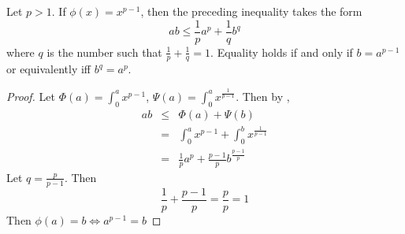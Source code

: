 \begin{pblm}\label{p:130}%
	Let $p > 1$. If $\phi(x) = x^{p-1}$, then the preceding inequality takes the form 
	\begin{equation*}
		ab \le \frac{1}{p}a^p + \frac{1}{q}b^q
	\end{equation*}
	where $q$ is the number such that $\frac{1}{p} + \frac{1}{q} = 1$. Equality holds if 
	and only if $b = a^{p-1}$ or equivalently iff $b^q = a^p$. 
\begin{proof}
	Let $\Phi(a) = \int_0^ax^{p-1}$, $\Psi(a) = \int_0^ax^{\frac{1}{p-1}}$. Then by ,
	\begin{equation*}
	\begin{array}{rcl}
		ab & \le & \Phi(a) + \Psi(b) \\
		& = & \int_0^a x^{p-1} + \int_0^b x^\frac{1}{p-1} \\ 
		& = & \frac{1}{p}a^p + \frac{p-1}{p}b^\frac{p-1}{p}
	\end{array}
	\end{equation*}
	Let $q = \frac{p}{p-1}$. Then 
	\begin{equation*}
		\frac{1}{p} + \frac{p-1}{p} = \frac{p}{p} = 1
	\end{equation*}
	Then $\phi(a) = b \Leftrightarrow a^{p-1} = b$
\end{proof}
\end{pblm}

